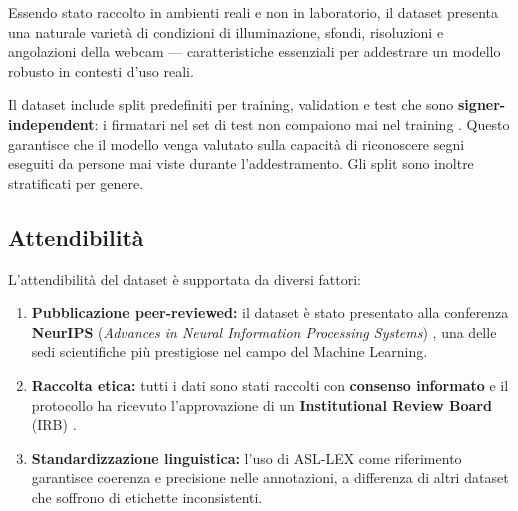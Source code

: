 Essendo stato raccolto in ambienti reali e non in laboratorio, il dataset presenta una naturale varietà di condizioni di illuminazione, sfondi, risoluzioni e angolazioni della webcam --- caratteristiche essenziali per addestrare un modello robusto in contesti d'uso reali.

Il dataset include split predefiniti per training, validation e test che sono \textbf{signer-independent}: i firmatari nel set di test non compaiono mai nel training \cite{desai2024aslcitizen}. Questo garantisce che il modello venga valutato sulla capacità di riconoscere segni eseguiti da persone mai viste durante l'addestramento. Gli split sono inoltre stratificati per genere.

\subsection{Attendibilità}

L'attendibilità del dataset è supportata da diversi fattori:

\begin{enumerate}
    \item \textbf{Pubblicazione peer-reviewed:} il dataset è stato presentato alla conferenza \textbf{NeurIPS} (\textit{Advances in Neural Information Processing Systems}) \cite{desai2024aslcitizen}, una delle sedi scientifiche più prestigiose nel campo del Machine Learning.

    \item \textbf{Raccolta etica:} tutti i dati sono stati raccolti con \textbf{consenso informato} e il protocollo ha ricevuto l'approvazione di un \textbf{Institutional Review Board} (IRB) \cite{desai2024aslcitizen}.

    \item \textbf{Standardizzazione linguistica:} l'uso di ASL-LEX \cite{asllex2017} come riferimento garantisce coerenza e precisione nelle annotazioni, a differenza di altri dataset che soffrono di etichette inconsistenti.

\end{enumerate}